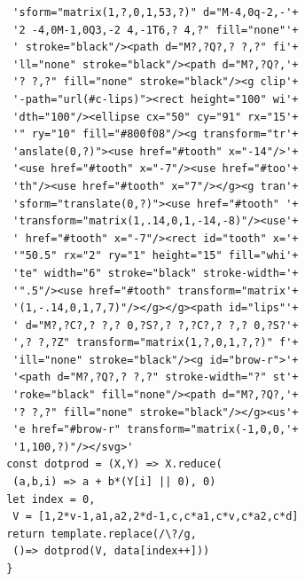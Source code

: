 \documentclass[conference]{IEEEtran}
\begin{document}
{\begin{verbatim}
  'sform="matrix(1,?,0,1,53,?)" d="M-4,0q-2,-'+
  '2 -4,0M-1,0Q3,-2 4,-1T6,? 4,?" fill="none"'+
  ' stroke="black"/><path d="M?,?Q?,? ?,?" fi'+
  'll="none" stroke="black"/><path d="M?,?Q?,'+
  '? ?,?" fill="none" stroke="black"/><g clip'+
  '-path="url(#c-lips)"><rect height="100" wi'+
  'dth="100"/><ellipse cx="50" cy="91" rx="15'+
  '" ry="10" fill="#800f08"/><g transform="tr'+
  'anslate(0,?)"><use href="#tooth" x="-14"/>'+
  '<use href="#tooth" x="-7"/><use href="#too'+
  'th"/><use href="#tooth" x="7"/></g><g tran'+
  'sform="translate(0,?)"><use href="#tooth" '+
  'transform="matrix(1,.14,0,1,-14,-8)"/><use'+
  ' href="#tooth" x="-7"/><rect id="tooth" x='+
  '"50.5" rx="2" ry="1" height="15" fill="whi'+
  'te" width="6" stroke="black" stroke-width='+
  '".5"/><use href="#tooth" transform="matrix'+
  '(1,-.14,0,1,7,7)"/></g></g><path id="lips"'+
  ' d="M?,?C?,? ?,? 0,?S?,? ?,?C?,? ?,? 0,?S?'+
  ',? ?,?Z" transform="matrix(1,?,0,1,?,?)" f'+
  'ill="none" stroke="black"/><g id="brow-r">'+
  '<path d="M?,?Q?,? ?,?" stroke-width="?" st'+
  'roke="black" fill="none"/><path d="M?,?Q?,'+
  '? ?,?" fill="none" stroke="black"/></g><us'+
  'e href="#brow-r" transform="matrix(-1,0,0,'+
  '1,100,?)"/></svg>'
 const dotprod = (X,Y) => X.reduce(
  (a,b,i) => a + b*(Y[i] || 0), 0)
 let index = 0,
  V = [1,2*v-1,a1,a2,2*d-1,c,c*a1,c*v,c*a2,c*d]
 return template.replace(/\?/g,
  ()=> dotprod(V, data[index++]))
 }
    \end{verbatim}
}




\end{document}
